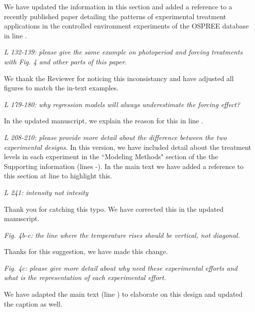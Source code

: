 \documentclass[11pt]{article}
\begin{document}
We have updated the information in this section and added a reference to a recently published paper detailing the patterns of experimental treatment applications in the controlled environment experiments of the OSPREE database in line .

\emph{L 132-139: please give the same example on photoperiod and forcing treatments with Fig. 4 and other parts of this paper.}

We thank the Reviewer for noticing this inconsistancy and have adjusted all figures to match the in-text examples.

\emph{L 179-180: why regression models will always underestimate the forcing effect?}

In the updated manuscript, we explain the reason for this in line .

\emph{L 208-210: please provide more detail about the difference between the two experimental designs.}
In this version, we have included detail about the treatment levels in each experiment in the ``Modeling Methods" section of the the Supporting information (lines -). In the main text we have added a reference to this section at line  to highlight this.

\emph{L 241: intensity not intesity}

Thank you for catching this typo. We have corrected this in the updated manuscript.

\emph{Fig. 4b-c: the line where the temperature rises should be vertical, not diagonal.}

Thanks for this suggestion, we have made this change.

\emph{Fig. 4c: please give more detail about why need these experimental efforts and what is the representation of each experimental effort.}

 We have adapted the main text (line ) to elaborate on this design and updated the caption as well.
\end{document}
